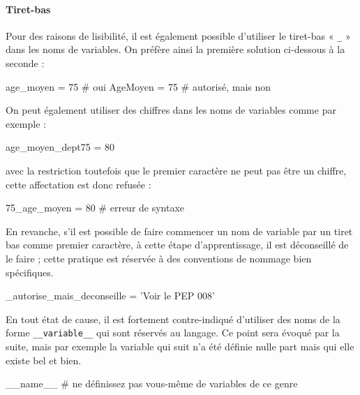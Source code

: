 \paragraph*{Tiret-bas} Pour des raisons de lisibilité, il est également possible d'utiliser le tiret-bas « \texttt{\_} » dans les noms de variables. On préfère ainsi la première solution ci-dessous à la seconde :

\begin{nbjupyterin}[before skip=4pt, after skip=4pt]{}
age_moyen = 75 # oui
AgeMoyen = 75 # autorisé, mais non
\end{nbjupyterin}



On peut également utiliser des chiffres dans les noms de variables comme par exemple :

\begin{nbjupyterin}[before skip=4pt, after skip=4pt]{}
age_moyen_dept75 = 80
\end{nbjupyterin}

\noindent avec la restriction toutefois que le premier caractère ne peut pas être un chiffre, cette affectation est donc refusée :

\begin{nbjupyterin}[before skip=4pt, after skip=6pt]{}
75_age_moyen = 80 # erreur de syntaxe
\end{nbjupyterin}

En revanche, s'il est possible de faire commencer un nom de variable par un tiret bas comme premier caractère, à cette étape d'apprentissage, il est déconseillé de le faire ; cette pratique est réservée à des conventions de nommage bien spécifiques.

\begin{nbjupyterin}[before skip=4pt, after skip=6pt]{}
_autorise_mais_deconseille = 'Voir le PEP 008'
\end{nbjupyterin}

En tout état de cause, il est fortement contre-indiqué d'utiliser des noms de la forme \texttt{\_\_variable\_\_} qui sont réservés au langage. Ce point sera évoqué par la suite, mais par exemple la variable qui suit n'a été définie nulle part mais qui elle existe bel et bien.

\begin{nbjupyterin}[before skip=4pt, after skip=6pt]{}
__name__  # ne définissez pas vous-même de variables de ce genre
\end{nbjupyterin}


